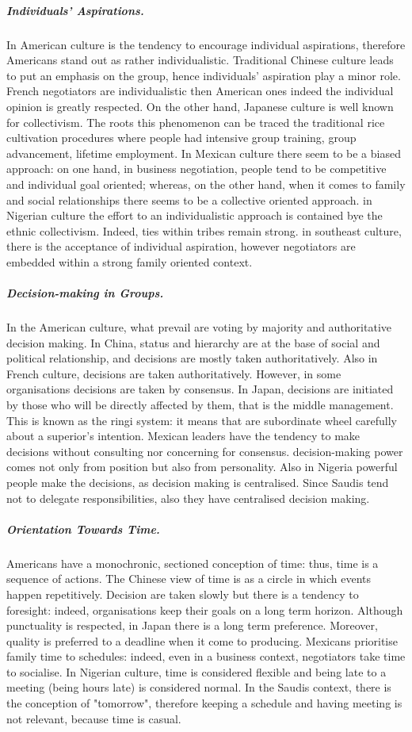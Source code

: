 \documentclass[../main.tex]{subfiles}
\begin{document}
\subparagraph{Individuals' Aspirations.} In American culture is the tendency  to encourage individual aspirations,  therefore Americans stand out as rather individualistic. Traditional Chinese culture leads to put an emphasis  on the group,  hence individuals' aspiration play a minor role. French negotiators are individualistic then American ones indeed the individual opinion is greatly respected.  On the other hand, Japanese culture is well known for collectivism.  The roots this phenomenon can be traced the traditional rice cultivation procedures where people had intensive group training, group advancement, lifetime employment. In Mexican culture there seem to be a biased approach: on one hand, in business negotiation, people tend to be competitive and  individual goal oriented; whereas, on the other hand, when it comes to family and social relationships there seems to be a collective oriented approach. in Nigerian culture the effort to an individualistic approach is contained bye the ethnic collectivism.  Indeed, ties within tribes remain strong. in southeast culture, there is the acceptance of individual aspiration, however negotiators are embedded within a strong family oriented context. 

\subparagraph{Decision-making in Groups.} In the American culture, what prevail are voting by majority and authoritative decision making. In China, status and hierarchy are at the base of social and political relationship, and decisions are mostly taken authoritatively. Also in French culture, decisions are taken authoritatively. However, in some organisations decisions are taken by consensus. In Japan, decisions are initiated by those who will be directly affected by them, that is the middle management. This is known as the ringi system: it means that are subordinate wheel carefully about a superior's intention. Mexican leaders have the tendency to make decisions without consulting nor concerning for consensus. decision-making power comes not only from position but also from personality. Also in Nigeria powerful people make the decisions, as decision making is centralised. Since Saudis tend not to delegate responsibilities, also they have centralised decision making.

\subparagraph{Orientation Towards Time.} Americans have a monochronic, sectioned conception of time: thus, time is a sequence of actions. The Chinese view of time is as a circle in which events happen repetitively. Decision are taken slowly but there is a tendency to foresight: indeed, organisations keep their goals on a long term horizon. Although punctuality is respected, in Japan there is a long term preference. Moreover, quality is preferred to a deadline when it come to producing. Mexicans prioritise family time to schedules: indeed, even in a business context, negotiators take time to socialise. In Nigerian culture, time is considered flexible and being late to a meeting (being hours late) is considered normal. In the Saudis context, there is the conception of "tomorrow", therefore keeping a schedule and having meeting is not relevant, because time is casual.
\end{document}
